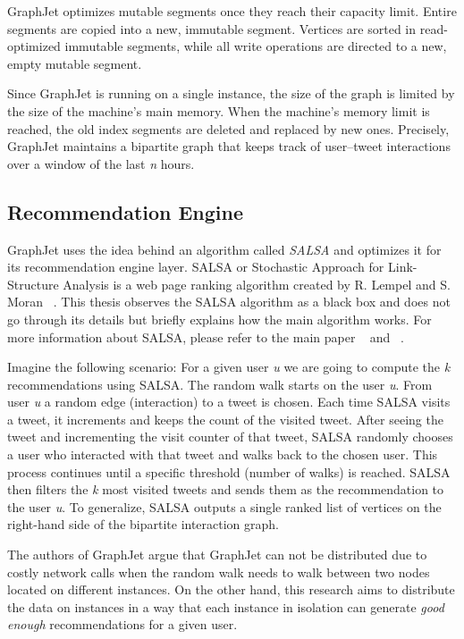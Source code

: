 GraphJet optimizes mutable segments once they reach their capacity limit. Entire segments are copied into a new, immutable segment. Vertices are sorted in read-optimized immutable segments, while all write operations are directed to a new, empty mutable segment.

Since GraphJet is running on a single instance, the size of the graph is limited by the size of the machine's main memory. When the machine's memory limit is reached, the old index segments are deleted and replaced by new ones. Precisely, GraphJet maintains a bipartite graph that keeps track of user–tweet interactions over a window of the last \textit{n} hours.

\subsection{Recommendation Engine}
\label{subsec:GraphJet-Recommendation-Engine}
GraphJet uses the idea behind an algorithm called \emph{SALSA} and optimizes it for its recommendation engine layer. SALSA or Stochastic Approach for Link-Structure Analysis is a web page ranking algorithm created by R. Lempel and S. Moran ~\cite{lempelSALSAStochasticApproach2001}. This thesis observes the SALSA algorithm as a black box and does not go through its details but briefly explains how the main algorithm works. For more information about SALSA, please refer to the main paper ~\cite{lempelSALSAStochasticApproach2001} and ~\cite{sharmaGraphJetRealtimeContent2016}.

Imagine the following scenario: For a given user \textit{u} we are going to compute the \textit{k} recommendations using SALSA. The random walk starts on the user \textit{u}. From user \textit{u} a random edge (interaction) to a tweet is chosen. Each time SALSA visits a tweet, it increments and keeps the count of the visited tweet. After seeing the tweet and incrementing the visit counter of that tweet, SALSA randomly chooses a user who interacted with that tweet and walks back to the chosen user. This process continues until a specific threshold (number of walks) is reached. SALSA then filters the \textit{k} most visited tweets and sends them as the recommendation to the user \textit{u}. To generalize, SALSA outputs a  single ranked list of vertices on the right-hand side of the bipartite interaction graph.

The authors of GraphJet argue that GraphJet can not be distributed due to costly network calls when the random walk needs to walk between two nodes located on different instances. On the other hand, this research aims to distribute the data on instances in a way that each instance in isolation can generate \emph{good enough} recommendations for a given user.

